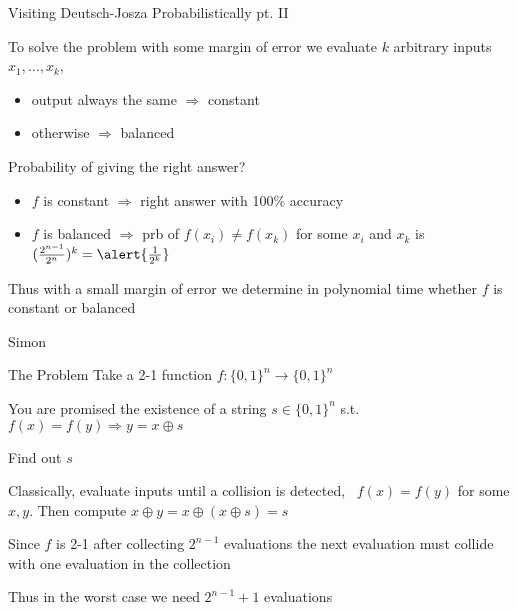 \documentclass{beamer}
\begin{document}
\begin{frame}{Visiting Deutsch-Josza Probabilistically pt. II}

        To solve the problem with \alert{some margin of error} we evaluate
        $k$ arbitrary inputs $x_1,\dots,x_k$,
        \begin{itemize}
                \item output always the same  $\Longrightarrow$ constant
                \item otherwise $\Longrightarrow$ balanced
        \end{itemize}
        \pause
        Probability of giving the right answer?

        \pause
        \begin{itemize}
                \item $f$ is constant $\Longrightarrow$  right answer
                        with 100\% accuracy
                \item $f$ is balanced $\Longrightarrow$ prb of 
                        $f(x_i) \not = f(x_k)$  for some $x_i$ and $x_k$ is 
                        $(\frac{2^{n-1}}{2^n})^k = \alert{\frac{1}{2^k}}$
        \end{itemize}

        \pause
        Thus with a small margin of error we determine in \alert{polynomial
        time} whether $f$ is constant or balanced
\end{frame}

\begin{frame}{Simon}
        \begin{block}{The Problem}
                Take a 2-1 function $f : \{0,1\}^n \to \{0,1\}^n$

                You are promised the existence of a string $s \in \{0,1\}^n$
                s.t.  $f(x) = f(y) \Rightarrow y = x \oplus s$

                Find out $s$
        \end{block}

        Classically, evaluate inputs until a collision is detected, \ie\
        $f(x) = f(y)$ for some $x,y$. Then compute $x \oplus y =
        x \oplus (x \oplus s) = s$

        Since $f$
        is 2-1 after collecting $2^{n-1}$ evaluations the next evaluation must
        collide with one evaluation in the collection

        Thus in the worst case we need $2^{n-1} + 1$ evaluations
\end{frame}
\end{document}
